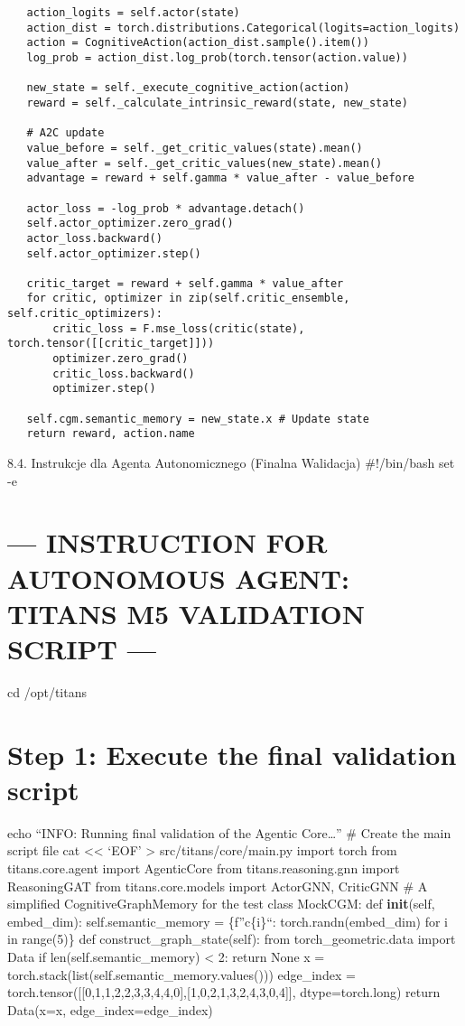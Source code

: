 \documentclass[letterpaper,twocolumn]{article}
\begin{document}
\begin{verbatim}
   action_logits = self.actor(state)
   action_dist = torch.distributions.Categorical(logits=action_logits)
   action = CognitiveAction(action_dist.sample().item())
   log_prob = action_dist.log_prob(torch.tensor(action.value))

   new_state = self._execute_cognitive_action(action)
   reward = self._calculate_intrinsic_reward(state, new_state)

   # A2C update
   value_before = self._get_critic_values(state).mean()
   value_after = self._get_critic_values(new_state).mean()
   advantage = reward + self.gamma * value_after - value_before

   actor_loss = -log_prob * advantage.detach()
   self.actor_optimizer.zero_grad()
   actor_loss.backward()
   self.actor_optimizer.step()
   
   critic_target = reward + self.gamma * value_after
   for critic, optimizer in zip(self.critic_ensemble, self.critic_optimizers):
       critic_loss = F.mse_loss(critic(state), torch.tensor([[critic_target]]))
       optimizer.zero_grad()
       critic_loss.backward()
       optimizer.step()
       
   self.cgm.semantic_memory = new_state.x # Update state
   return reward, action.name
\end{verbatim}

8.4. Instrukcje dla Agenta Autonomicznego (Finalna Walidacja)
\#!/bin/bash set -e

\hypertarget{instruction-for-autonomous-agent-titans-m5-validation-script}{%
\section{--- INSTRUCTION FOR AUTONOMOUS AGENT: TITANS M5 VALIDATION
SCRIPT
---}\label{instruction-for-autonomous-agent-titans-m5-validation-script}}

cd /opt/titans

\hypertarget{step-1-execute-the-final-validation-script}{%
\section{Step 1: Execute the final validation
script}\label{step-1-execute-the-final-validation-script}}

echo ``INFO: Running final validation of the Agentic Core\ldots{}'' \#
Create the main script file cat \textless\textless{} `EOF'
\textgreater{} src/titans/core/main.py import torch from
titans.core.agent import AgenticCore from titans.reasoning.gnn import
ReasoningGAT from titans.core.models import ActorGNN, CriticGNN \# A
simplified CognitiveGraphMemory for the test class MockCGM: def
\textbf{init}(self, embed\_dim): self.semantic\_memory = \{f''c\{i\}``:
torch.randn(embed\_dim) for i in range(5)\} def
construct\_graph\_state(self): from torch\_geometric.data import Data if
len(self.semantic\_memory) \textless{} 2: return None x =
torch.stack(list(self.semantic\_memory.values())) edge\_index =
torch.tensor({[}{[}0,1,1,2,2,3,3,4,4,0{]},{[}1,0,2,1,3,2,4,3,0,4{]}{]},
dtype=torch.long) return Data(x=x, edge\_index=edge\_index)
\end{document}
